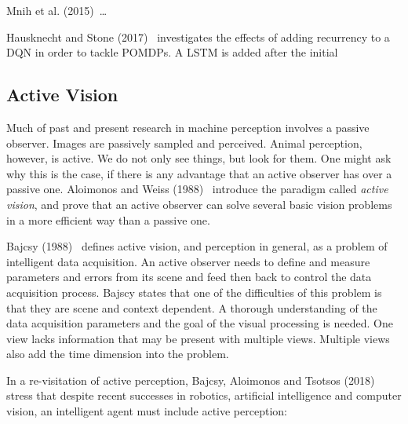 Mnih et al. (2015)~\cite{mnih_human_2015}\dots


Hausknecht and Stone (2017)~\cite{hausknecht_stone_2017} investigates the effects of adding recurrency to a DQN in order to tackle POMDPs.
A LSTM is added after the initial 


\subsection{Active Vision}
\label{sec:activevision}


Much of past and present research in machine perception involves a passive observer.
Images are passively sampled and perceived.
Animal perception, however, is active.
We do not only see things, but look for them.
One might ask why this is the case, if there is any advantage that an active observer has over a passive one.
Aloimonos and Weiss (1988)~\cite{aloimonos_active_1988} introduce the paradigm called \textit{active vision}, and prove that an active observer can solve several basic vision problems in a more efficient way than a passive one.

Bajcsy (1988)~\cite{bajcsy_1988} defines active vision, and perception in general, as a problem of intelligent data acquisition.
An active observer needs to define and measure parameters and errors from its scene and feed then back to control the data acquisition process.
Bajscy states that one of the difficulties of this problem is that they are scene and context dependent.
A thorough understanding of the data acquisition parameters and the goal of the visual processing is needed.
One view lacks information that may be present with multiple views.
Multiple views also add the time dimension into the problem.

In a re-visitation of active perception, Bajcsy, Aloimonos and Tsotsos (2018)~\cite{bajcsy_aloimonos_tsotsos_2018} stress that despite recent successes in robotics, artificial intelligence and computer vision, an intelligent agent must include active perception:

